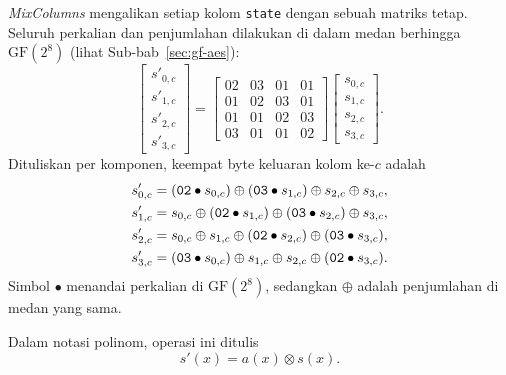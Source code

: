 \textit{MixColumns} mengalikan setiap kolom \texttt{state} dengan sebuah matriks
tetap. Seluruh perkalian dan penjumlahan dilakukan di dalam medan berhingga
$\text{GF}(2^8)$ (lihat Sub-bab~\ref{sec:gf-aes}):
\begin{equation}
\begin{bmatrix}
s'_{0,c} \\ s'_{1,c} \\ s'_{2,c} \\ s'_{3,c}
\end{bmatrix}
=
\begin{bmatrix}
02 & 03 & 01 & 01 \\
01 & 02 & 03 & 01 \\
01 & 01 & 02 & 03 \\
03 & 01 & 01 & 02
\end{bmatrix}
\begin{bmatrix}
s_{0,c} \\ s_{1,c} \\ s_{2,c} \\ s_{3,c}
\end{bmatrix}.
\label{eq:aes-mixcolumns}
\end{equation}
Dituliskan per komponen, keempat byte keluaran kolom ke-$c$ adalah
\begin{equation}
\begin{aligned}
s'_{0,c} &= (\texttt{02} \bullet s_{0,c}) \oplus (\texttt{03} \bullet s_{1,c}) \oplus s_{2,c} \oplus s_{3,c}, \\
s'_{1,c} &= s_{0,c} \oplus (\texttt{02} \bullet s_{1,c}) \oplus (\texttt{03} \bullet s_{2,c}) \oplus s_{3,c}, \\
s'_{2,c} &= s_{0,c} \oplus s_{1,c} \oplus (\texttt{02} \bullet s_{2,c}) \oplus (\texttt{03} \bullet s_{3,c}), \\
s'_{3,c} &= (\texttt{03} \bullet s_{0,c}) \oplus s_{1,c} \oplus s_{2,c} \oplus (\texttt{02} \bullet s_{3,c}).
\end{aligned}
\label{eq:aes-mixcolumns-komponen}
\end{equation}
Simbol $\bullet$ menandai perkalian di $\text{GF}(2^8)$, sedangkan $\oplus$
adalah penjumlahan di medan yang sama.

Dalam notasi polinom, operasi ini ditulis
\begin{equation}
s'(x) = a(x) \otimes s(x).
\label{eq:aes-mixcolumns-polinom}
\end{equation}

